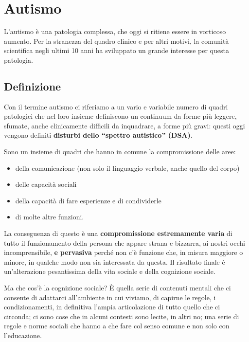 \section{Autismo}

L'autismo è una patologia complessa, che oggi si ritiene essere in
vorticoso aumento. Per la stranezza del quadro clinico e per altri
motivi, la comunità scientifica negli ultimi 10 anni ha sviluppato un
grande interesse per questa patologia.

\subsection{Definizione}

Con il termine autismo ci riferiamo a un vario e variabile numero di
quadri patologici che nel loro insieme definiscono un continuum da forme
più leggere, sfumate, anche clinicamente difficili da inquadrare, a
forme più gravi: questi oggi vengono definiti \textbf{disturbi dello
``spettro autistico'' (DSA)}.

Sono un insieme di quadri che hanno in comune la compromissione delle
aree:

\begin{itemize}
\item
  della comunicazione (non solo il linguaggio verbale, anche quello del
  corpo)
\item
  delle capacità sociali
\item
  della capacità di fare esperienze e di condividerle
\item
  di molte altre funzioni.
\end{itemize}

La conseguenza di questo è una \textbf{compromissione estremamente
varia} di tutto il funzionamento della persona che appare strana e
bizzarra, ai nostri occhi incomprensibile, \textbf{e} \textbf{pervasiva}
perché non c'è funzione che, in misura maggiore o minore, in qualche
modo non sia interessata da questa. Il risultato finale è un'alterazione
pesantissima della vita sociale e della cognizione sociale.

Ma che cos'è la cognizione sociale? È quella serie di contenuti mentali
che ci consente di adattarci all'ambiente in cui viviamo, di capirne le
regole, i condizionamenti, in definitiva l'ampia articolazione di tutto
quello che ci circonda; ci sono cose che in alcuni contesti sono lecite,
in altri no; una serie di regole e norme sociali che hanno a che fare
col senso comune e non solo con l'educazione.

